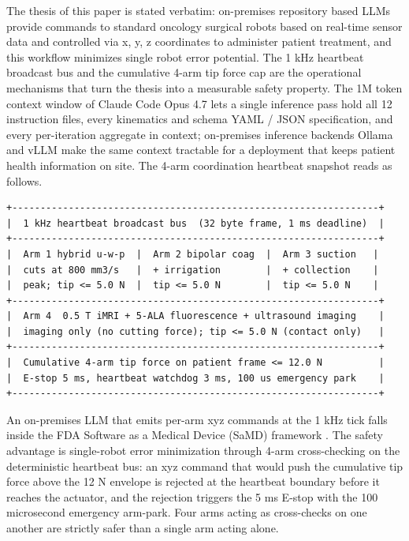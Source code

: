 The thesis of this paper is stated verbatim: on-premises repository
based LLMs provide commands to standard oncology surgical robots
based on real-time sensor data and controlled via x, y, z coordinates
to administer patient treatment, and this workflow minimizes single
robot error potential. The 1 kHz heartbeat broadcast bus and the
cumulative 4-arm tip force cap are the operational mechanisms that
turn the thesis into a measurable safety property. The 1M token
context window of Claude Code Opus 4.7 \cite{claude-opus-47,
claude-code} lets a single inference pass hold all 12 instruction
files, every kinematics and schema YAML / JSON specification, and
every per-iteration aggregate in context; on-premises inference
backends Ollama \cite{ollama} and vLLM \cite{vllm} make the same
context tractable for a deployment that keeps patient health
information on site. The 4-arm coordination heartbeat snapshot reads
as follows.

\begin{verbatim}
+-----------------------------------------------------------------+
|  1 kHz heartbeat broadcast bus  (32 byte frame, 1 ms deadline)  |
+-----------------------------------------------------------------+
|  Arm 1 hybrid u-w-p  |  Arm 2 bipolar coag  |  Arm 3 suction   |
|  cuts at 800 mm3/s   |  + irrigation        |  + collection    |
|  peak; tip <= 5.0 N  |  tip <= 5.0 N        |  tip <= 5.0 N    |
+-----------------------------------------------------------------+
|  Arm 4  0.5 T iMRI + 5-ALA fluorescence + ultrasound imaging    |
|  imaging only (no cutting force); tip <= 5.0 N (contact only)   |
+-----------------------------------------------------------------+
|  Cumulative 4-arm tip force on patient frame <= 12.0 N          |
|  E-stop 5 ms, heartbeat watchdog 3 ms, 100 us emergency park    |
+-----------------------------------------------------------------+
\end{verbatim}

An on-premises LLM that emits per-arm xyz commands at the 1 kHz tick
falls inside the FDA Software as a Medical Device (SaMD) framework
\cite{fda-samd}. The safety advantage is single-robot error
minimization through 4-arm cross-checking on the deterministic
heartbeat bus: an xyz command that would push the cumulative tip
force above the 12 N envelope is rejected at the heartbeat boundary
before it reaches the actuator, and the rejection triggers the 5 ms
E-stop with the 100 microsecond emergency arm-park. Four arms acting
as cross-checks on one another are strictly safer than a single arm
acting alone.

